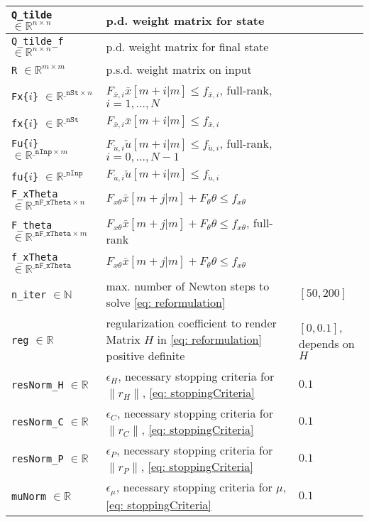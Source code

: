 \documentclass[letter]{article}
\begin{document}
\begin{sffamily}
\begin{table}[!htdp]
\begin{center}
\begin{tabular}{|l|l|l|}
 \texttt{Q\_tilde} $\in\mathbb{R}^{n\times n}$ & p.d. weight matrix for state & \\ \hline
 \texttt{Q\_tilde\_f} $\in\mathbb{R}^{n\times n}$ & p.d. weight matrix for final state & \\ \hline
 \texttt{R} $\in\mathbb{R}^{m\times m}$ & p.s.d. weight matrix on input & \\ \hline
 \texttt{Fx\{$i$\}} $\in\mathbb{R}^{\texttt{\_nSt}\times n}$ & $F_{\bar{x},i}\bar{x}[m+i|m] \leq f_{\bar{x},i}$, full-rank, $i=1,\ldots,N$ & \\ \hline
 \texttt{fx\{$i$\}} $\in\mathbb{R}^{\texttt{\_nSt}}$ & $F_{\bar{x},i}\bar{x}[m+i|m] \leq f_{\bar{x},i}$ & \\ \hline
 \texttt{Fu\{$i$\}} $\in\mathbb{R}^{\texttt{\_nInp}\times m}$ & $F_{\check{u},i}\check{u}[m+i|m] \leq f_{\check{u},i}$, full-rank, $i=0,\ldots,N-1$ & \\ \hline
 \texttt{fu\{$i$\}} $\in\mathbb{R}^{\texttt{\_nInp}}$ & $F_{\check{u},i}\check{u}[m+i|m] \leq f_{\check{u},i}$ & \\ \hline
 \texttt{F\_xTheta} $\in\mathbb{R}^{\texttt{\_nF\_xTheta}\times n}$ & $F_{x\theta}\bar{x}[m+j|m] + F_\theta \theta \leq f_{x\theta}$ & \\ \hline
 \texttt{F\_theta} $\in\mathbb{R}^{\texttt{\_nF\_xTheta}\times m}$ & $F_{x\theta}\bar{x}[m+j|m] + F_\theta \theta \leq f_{x\theta}$, full-rank & \\ \hline
 \texttt{f\_xTheta} $\in\mathbb{R}^{\texttt{\_nF\_xTheta}}$ & $F_{x\theta}\bar{x}[m+j|m] + F_\theta \theta \leq f_{x\theta}$ & \\ \hline \hline

 \texttt{n\_iter} $\in\mathbb{N}$ & max. number of Newton steps to solve \eqref{eq: reformulation} & $[50,200]$ \\ \hline
 \texttt{reg} $\in\mathbb{R}$  & regularization coefficient to render Matrix $H$ in \eqref{eq: reformulation} positive definite & $[0,0.1]$, depends on $H$ \\ \hline
 \texttt{resNorm\_H}  $\in\mathbb{R}$& $\epsilon_H$, necessary stopping criteria for $\|r_H\|$, \eqref{eq: stoppingCriteria} & $0.1$ \\ \hline
 \texttt{resNorm\_C} $\in\mathbb{R}$ & $\epsilon_C$, necessary stopping criteria for $\|r_C\|$, \eqref{eq: stoppingCriteria} & $0.1$ \\ \hline
 \texttt{resNorm\_P} $\in\mathbb{R}$ & $\epsilon_P$, necessary stopping criteria for $\|r_P\|$, \eqref{eq: stoppingCriteria} & $0.1$ \\ \hline
 \texttt{muNorm} $\in\mathbb{R}$ & $\epsilon_\mu$, necessary stopping criteria for $\mu$, \eqref{eq: stoppingCriteria} & $0.1$ \\ \hline


\end{tabular}
\end{center}
\end{table}
\end{sffamily}
\end{document}
